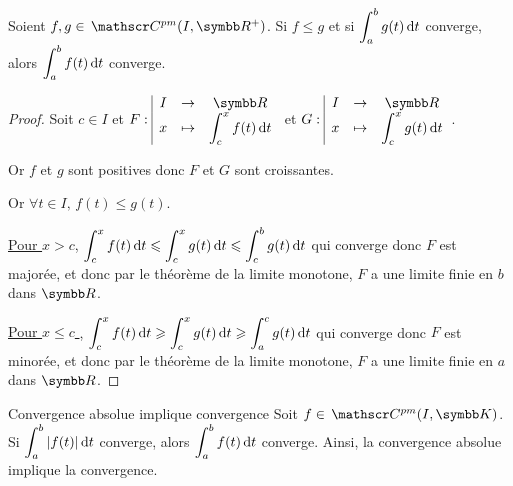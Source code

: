 \begin{proposition}{}{}
    Soient $f, g \in \mc{pm}(I, \R^+)$. Si $f \leqslant g$ et si
    $\displaystyle \int_{a }^{b } g(t) \,\mathrm{d}t$ converge, alors $\displaystyle \int_{a }^{b } f(t) \,\mathrm{d}t$ converge.
\end{proposition}


\begin{proof}
    Soit $c \in I$ et $\fonction F I \R x {\int_c^x f(t) \dt}$ et $\fonction G I \R x {\int_c^x g(t) \dt}$.

    Or $f$ et $g$ sont positives donc $F$ et $G$ sont croissantes.

    Or $\forall t \in I, \, f(t) \leqslant g(t)$. 

    \uline{Pour $x > c$}, $\displaystyle \int_{c }^{x } f(t) \,\mathrm{d}t \leqslant \int_{c }^{x } g(t) \,\mathrm{d}t \leqslant \int_{c }^{b } g(t) \,\mathrm{d}t$ qui converge 
    donc $F$ est majorée, et donc par le théorème de la limite monotone, $F$ a une limite finie en $b$ dans $\R$.

    \avspace \uline{Pour $x \leqslant c$ }, $\displaystyle \int_{c }^{x } f(t) \,\mathrm{d}t \geqslant \int_{c }^{x } g(t) \,\mathrm{d}t \geqslant \int_{a }^{c } g(t) \,\mathrm{d}t$ qui converge
    donc $F$ est minorée, et donc par le théorème de la limite monotone, $F$ a une limite finie en $a$ dans $\R$.
\end{proof}


\begin{theoreme}{Convergence absolue implique convergence}{}
    Soit $f \in \mc{pm}(I, \K)$. Si $\displaystyle \int_{a }^{b } |f(t)| \,\mathrm{d}t$ converge, alors 
    $\displaystyle \int_{a }^{b } f(t) \,\mathrm{d}t$ converge. Ainsi, la convergence absolue 
    implique la convergence.
\end{theoreme}


